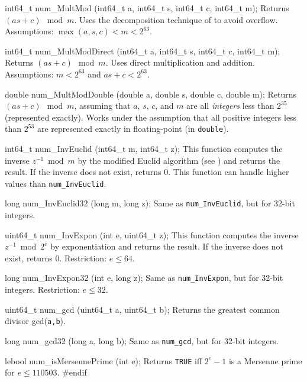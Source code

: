 int64_t num_MultMod (int64_t a, int64_t s, int64_t c, int64_t m);
\endcode
\tab  Returns $(as + c) \mod m$.  Uses the decomposition technique
  of \cite{rLEC91a} to avoid overflow. 
	Assumptions: $\max(a,s,c) < m < 2^{63}$.
\endtab
\code

int64_t num_MultModDirect (int64_t a, int64_t s, int64_t c, int64_t m);
\endcode
\tab  Returns $(as + c) \mod m$.  Uses direct multiplication and addition.
  Assumptions: $m < 2^{63}$ and $as+c < 2^{63}$. 
\endtab
\code

double num_MultModDouble (double a, double s, double c, double m);
\endcode
 \tab  Returns $(as+c) \mod m$, assuming that
  $a$, $s$, $c$, and $m$ are all {\em integers\/} less than $2^{35}$ 
  (represented exactly).
  Works under the assumption that all positive integers less than 
  $2^{53}$ are represented exactly in floating-point (in {\tt double}).
\endtab
\code

int64_t num_InvEuclid (int64_t m, int64_t z);
\endcode
 \tab  This function computes the inverse $z^{-1}\bmod m$ by the 
  modified Euclid algorithm (see \cite[p. 325]{iKNU81a}) and returns
  the result. If the inverse does not exist, returns 0. This function
  can handle higher values than {\tt num\_InvEuclid}.
\endtab
\code

long num_InvEuclid32 (long m, long z);
\endcode
 \tab  Same as \texttt{num\_InvEuclid}, but for 32-bit integers.   
\endtab
\code

uint64_t num_InvExpon (int e, uint64_t z);
\endcode
 \tab
  This function computes the inverse  $z^{-1} \bmod 2^e$
  by exponentiation  and returns the result. If the inverse does not  exist, returns 0.
  Restriction: $e \le 64$.
 \endtab
\code

long num_InvExpon32 (int e, long z);
 \endcode
 \tab  Same as \texttt{num\_InvExpon}, but for 32-bit integers.
  Restriction: $e \le 32$.   
\endtab
\code

uint64_t num_gcd (uint64_t a, uint64_t b);
 \endcode
 \tab  Returns the greatest common divisor gcd(\texttt{a,b}).  
\endtab
\code

long num_gcd32 (long a, long b);
 \endcode
 \tab  Same as \texttt{num\_gcd}, but for 32-bit integers.  
\endtab
\code

lebool num_isMersennePrime (int e);
 \endcode
 \tab  Returns \texttt{TRUE} iff $2^e-1$ is a Mersenne prime for $e \le 110503$.   
\endtab
\code\hide
#endif
\endhide\endcode
